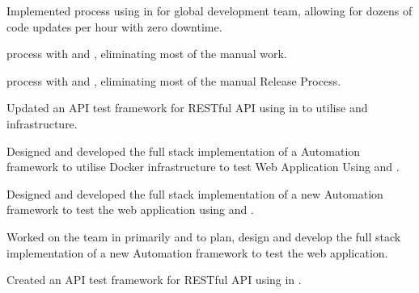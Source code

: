 \documentclass[]{openfont}
\begin{document}
\begin{minipage}[t]{0.66\textwidth}
\vspace{\topsep} %
\begin{tightemize}
\item Implemented  process using  in  for global development team, allowing for dozens of code updates per hour with zero downtime.
\item {} process with  and , eliminating most of the manual work.
\item {} process with  and , eliminating most of the manual Release Process.
\item Updated an API test framework for RESTful API using  in  to utilise  and  infrastructure.
\item Designed and developed the full stack implementation of a Automation framework to utilise Docker infrastructure to test Web Application Using  and .
\end{tightemize}
\sectionsep

\begin{tightemize}
\item Designed and developed the full stack implementation of a new Automation framework to test the web application using  and .
\end{tightemize}
\sectionsep

\begin{tightemize}
\item Worked on the \href{https://www.xpo.com/solutions/transportation/last-mile}{} team in primarily  and  to plan, design and develop the full stack implementation of a new Automation framework to test the web application.
\item Created an API test framework for RESTful API using  in .
\end{tightemize}
\sectionsep


\end{minipage}
\end{document}
